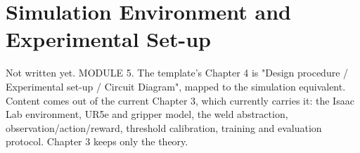 \chapter{Simulation Environment and Experimental Set-up}\label{ch:setup}

\begin{draftnote}
Not written yet. MODULE 5. The template's Chapter 4 is "Design procedure / Experimental set-up / Circuit Diagram", mapped to the simulation equivalent. Content comes out of the current Chapter 3, which currently carries it: the Isaac Lab environment, UR5e and gripper model, the weld abstraction, observation/action/reward, threshold calibration, training and evaluation protocol. Chapter 3 keeps only the theory.
\end{draftnote}
